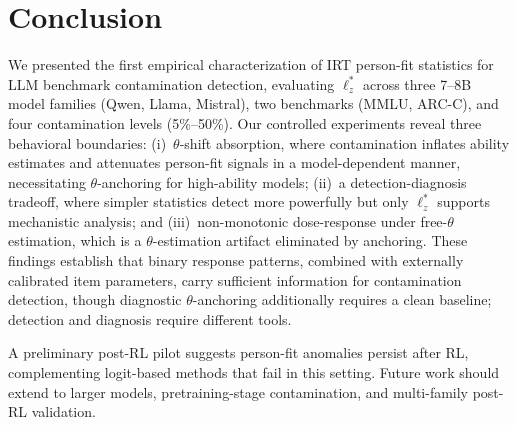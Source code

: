 \section{Conclusion}\label{sec:conclusion}

We presented the first empirical characterization of IRT person-fit statistics for LLM benchmark contamination detection, evaluating $\ell_z^*$ across three 7--8B model families (Qwen, Llama, Mistral), two benchmarks (MMLU, ARC-C), and four contamination levels (5\%--50\%).
Our controlled experiments reveal three behavioral boundaries: (i)~$\theta$-shift absorption, where contamination inflates ability estimates and attenuates person-fit signals in a model-dependent manner, necessitating $\theta$-anchoring for high-ability models; (ii)~a detection-diagnosis tradeoff, where simpler statistics detect more powerfully but only $\ell_z^*$ supports mechanistic analysis; and (iii)~non-monotonic dose-response under free-$\theta$ estimation, which is a $\theta$-estimation artifact eliminated by anchoring.
These findings establish that binary response patterns, combined with externally calibrated item parameters, carry sufficient information for contamination detection, though diagnostic $\theta$-anchoring additionally requires a clean baseline; detection and diagnosis require different tools.

A preliminary post-RL pilot suggests person-fit anomalies persist after RL, complementing logit-based methods that fail in this setting.
Future work should extend to larger models, pretraining-stage contamination, and multi-family post-RL validation.
